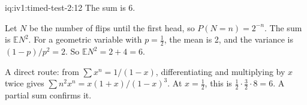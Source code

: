 \begin{solution}{iq:iv1:timed-test-2:12}
The sum is 6.

Let $N$ be the number of flips until the first head, so $P(N = n) = 2^{-n}$. The sum is $\mathbb{E}N^2$. For a geometric variable with $p = \frac12$, the mean is 2, and the variance is $(1 - p)/p^2 = 2$. So $\mathbb{E}N^2 = 2 + 4 = 6$.

A direct route: from $\sum x^n = 1/(1 - x)$, differentiating and multiplying by $x$ twice gives $\sum n^2x^n = x(1 + x)/(1 - x)^3$. At $x = \frac12$, this is $\frac12 \cdot \frac32 \cdot 8 = 6$. A partial sum confirms it.


\end{solution}
